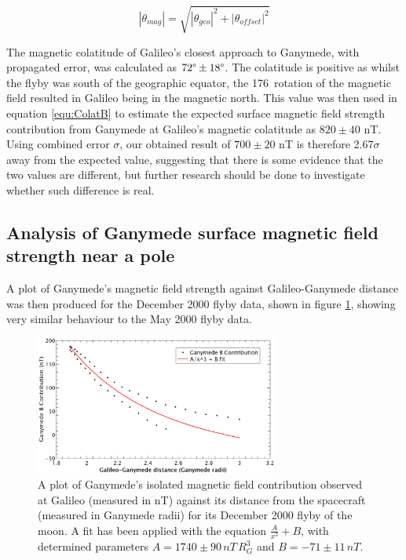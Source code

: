 \documentclass[11pt]{article}
\begin{document}
\begin{equation}
\label{equ:MagColat}
    |\theta_{mag}| = \sqrt{|\theta_{geo}|^{2} + |\theta_{offset}|^{2}}
\end{equation}

The magnetic colatitude of Galileo's closest approach to Ganymede, with propagated error, was calculated as $72\degree \pm 18\degree$. The colatitude is positive as whilst the flyby was south of the geographic equator, the 176\degree\, rotation of the magnetic field resulted in Galileo being in the magnetic north. This value was then used in equation \ref{equ:ColatB} to estimate the expected surface magnetic field strength contribution from Ganymede at Galileo's magnetic colatitude as $820 \pm 40$ nT. Using combined error $\sigma$, our obtained result of $700 \pm 20$ nT is therefore 2.67$\sigma$ away from the expected value, suggesting that there is some evidence that the two values are different, but further research should be done to investigate whether such difference is real.

\subsection{Analysis of Ganymede surface magnetic field strength near a pole}

A plot of Ganymede's magnetic field strength against Galileo-Ganymede distance was then produced for the December 2000 flyby data, shown in figure \ref{fig:DecDist-Mag}, showing very similar behaviour to the May 2000 flyby data.

\begin{figure}[!htb]
    \centering
    \includegraphics[width=8cm]{DecDist-Mag.png}
    \captionsetup{width=13cm}
    \caption{A plot of Ganymede's isolated magnetic field contribution observed at Galileo (measured in nT) against its distance from the spacecraft (measured in Ganymede radii) for its December 2000 flyby of the moon. A fit has been applied with the equation $\frac{A}{x^{3}} + B$, with determined parameters $A = 1740 \pm 90\,nT\,R_{G}^{3}$ and $B = -71 \pm 11\,nT$.}
    \label{fig:DecDist-Mag}
\end{figure}
\end{document}
